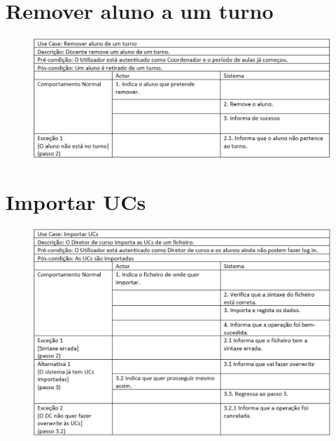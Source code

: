 \documentclass[12pt,a4paper]{report}
\begin{document}
\begin{appendices}
\section{Remover aluno a um turno}
\begin{figure}[H]
	\centering 
	\includegraphics[width=\textwidth]{modelacao/especificacao_use_case/removealuno.png}  
\end{figure}

\section{Importar UCs}
\begin{figure}[H]
	\centering 
	\includegraphics[width=\textwidth]{modelacao/especificacao_use_case/importarUCs.png}  
\end{figure}


\end{appendices}
\end{document}
